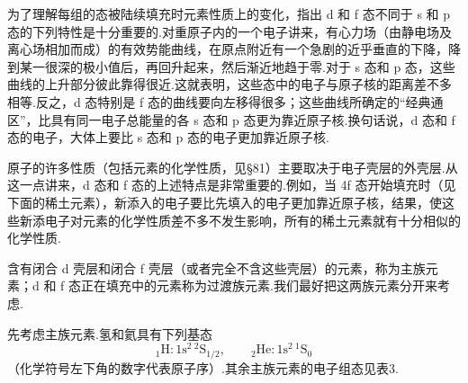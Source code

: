 为了理解每组的态被陆续填充时元素性质上的变化，指出 d 和 f 态不同于 s 和 p 态的下列特性是十分重要的.对重原子内的一个电子讲来，有心力场（由静电场及离心场相加而成）的有效势能曲线，在原点附近有一个急剧的近乎垂直的下降，降到某一很深的极小值后，再回升起来，然后渐近地趋于零.对于 s 态和 p 态，这些曲线的上升部分彼此靠得很近.这就表明，这些态中的电子与原子核的距离差不多相等.反之，d 态特别是 f 态的曲线要向左移得很多；这些曲线所确定的“经典通区”，比具有同一电子总能量的各 s 态和 p 态更为靠近原子核.换句话说，d 态和 f 态的电子，大体上要比 s 态和 p 态的电子更加靠近原子核.

原子的许多性质（包括元素的化学性质，见§81）主要取决于电子壳层的外壳层.从这一点讲来，d 态和 f 态的上述特点是非常重要的.例如，当 4f 态开始填充时（见下面的稀土元素），新添入的电子要比先填入的电子更加靠近原子核，结果，使这些新添电子对元素的化学性质差不多不发生影响，所有的稀土元素就有十分相似的化学性质.

含有闭合 d 壳层和闭合 f 壳层（或者完全不含这些壳层）的元素，称为主族元素；d 和 f 态正在填充中的元素称为过渡族元素.我们最好把这两族元素分开来考虑.

先考虑主族元素.氢和氦具有下列基态
\begin{equation*}
  {}_{1}\mathrm{H}:1\mathrm{s}^{2}\,{}^{2}\mathrm{S}_{1/2},
  \qquad
  {}_{2}\mathrm{He}:1\mathrm{s}^{2}\,{}^{1}\mathrm{S}_{0}
\end{equation*}
（化学符号左下角的数字代表原子序）.其余主族元素的电子组态见表3.

